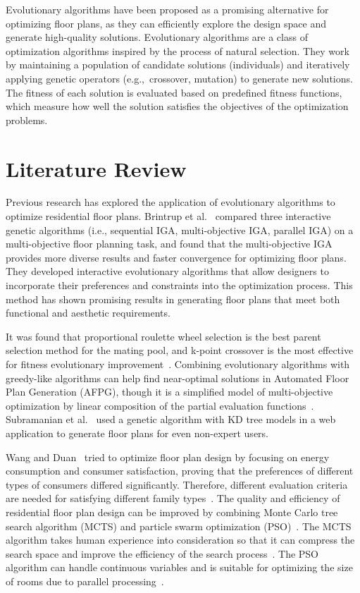 \documentclass[]{article}
\begin{document}
Evolutionary algorithms have been proposed as a promising alternative for optimizing floor plans, as they can efficiently explore the design space and generate high-quality solutions. Evolutionary algorithms are a class of optimization algorithms inspired by the process of natural selection. They work by maintaining a population of candidate solutions (individuals) and iteratively applying genetic operators (e.g.,\ crossover, mutation) to generate new solutions. The fitness of each solution is evaluated based on predefined fitness functions, which measure how well the solution satisfies the objectives of the optimization problems.

\section{Literature Review}
Previous research has explored the application of evolutionary algorithms to optimize residential floor plans. Brintrup et al.~\cite{10.1007/11732242_56} compared three interactive genetic algorithms (i.e., sequential IGA, multi-objective IGA, parallel IGA) on a multi-objective floor planning task, and found that the multi-objective IGA provides more diverse results and faster convergence for optimizing floor plans. They developed interactive evolutionary algorithms that allow designers to incorporate their preferences and constraints into the optimization process. This method has shown promising results in generating floor plans that meet both functional and aesthetic requirements.

It was found that proportional roulette wheel selection is the best parent selection method for the mating pool, and k-point crossover is the most effective for fitness evolutionary improvement~\cite{7844659}.
Combining evolutionary algorithms with greedy-like algorithms can help find near-optimal solutions in Automated Floor Plan Generation (AFPG), though it is a simplified model of multi-objective optimization by linear composition of the partial evaluation functions~\cite{doi:10.1177/1478077119832982}. Subramanian et al.~\cite{9675541} used a genetic algorithm with KD tree models in a web application to generate floor plans for even non-expert users.

Wang and Duan~\cite{WANG2023100238} tried to optimize floor plan design by focusing on energy consumption and consumer satisfaction, proving that the preferences of different types of consumers differed significantly. Therefore, different evaluation criteria are needed for satisfying different family types~\cite{WANG2023100238}. The quality and efficiency of residential floor plan design can be improved by combining Monte Carlo tree search algorithm (MCTS) and particle swarm optimization (PSO)~\cite{YAN2024110546}. The MCTS algorithm takes human experience into consideration so that it can compress the search space and improve the efficiency of the search process~\cite{YAN2024110546}. The PSO algorithm can handle continuous variables and is suitable for optimizing the size of rooms due to parallel processing~\cite{YAN2024110546}.
\end{document}
